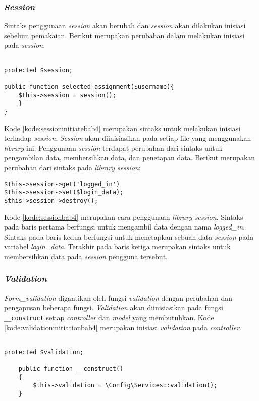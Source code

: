 \subsubsection{\textit{Session}}
Sintaks penggunaan \textit{session} akan berubah dan \textit{session} akan dilakukan inisiasi sebelum pemakaian. Berikut merupakan perubahan dalam melakukan inisiasi pada \textit{session}.
\begin{lstlisting}[caption=Perancangan inisiasi \textit{library session}, label=kode:sessioninitiatebab4]

protected $session;

public function selected_assignment($username){
	$this->session = session();
	}
}
\end{lstlisting}
Kode \ref{kode:sessioninitiatebab4} merupakan sintaks untuk melakukan inisiasi terhadap \textit{session}. \textit{Session} akan diinisiasikan pada setiap file yang menggunakan \textit{library} ini. Penggunaan \textit{session} terdapat perubahan dari sintaks untuk pengambilan data, membersihkan data, dan penetapan data. Berikut merupakan perubahan dari sintaks pada \textit{library session}:
\begin{lstlisting}[caption=Perancangan penggunaan \textit{library session}, label=kode:sessionbab4]
$this->session->get('logged_in')
$this->session->set($login_data);
$this->session->destroy();
\end{lstlisting}
Kode \ref{kode:sessionbab4} merupakan cara penggunaan \textit{library session}. Sintaks pada baris pertama berfungsi untuk mengambil data dengan nama \textit{logged\_in}. Sintaks pada baris kedua berfungsi untuk menetapkan sebuah data \textit{session} pada variabel \textit{login\_data}. Terakhir pada baris ketiga merupakan sintaks untuk membersihkan data pada \textit{session} pengguna tersebut.

\subsubsection{\textit{Validation}}
\textit{Form\_validation} digantikan oleh fungsi \textit{validation} dengan perubahan dan pengapusan beberapa fungsi. \textit{Validation} akan diinisiasikan pada fungsi \texttt{\_\_construct} setiap \textit{controller} dan \textit{model} yang membutuhkan. Kode \ref{kode:validationinitiationbab4} merupakan inisiasi \textit{validation} pada \textit{controller}.

\begin{lstlisting}[caption=Perancangan inisiasi \textit{validation} pada \texttt{\_\_construct}, label=kode:validationinitiationbab4]

protected $validation;

	public function __construct()
	{
		$this->validation = \Config\Services::validation();
	}
\end{lstlisting}

